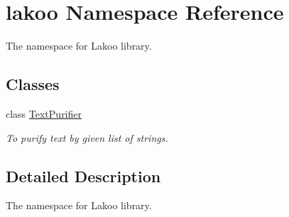 \hypertarget{namespacelakoo}{}\section{lakoo Namespace Reference}
\label{namespacelakoo}


The namespace for Lakoo library.  


\subsection*{Classes}
\begin{DoxyCompactItemize}
\item 
class \hyperlink{classlakoo_1_1_text_purifier}{Text\+Purifier}
\begin{DoxyCompactList}\small\item\em To purify text by given list of strings. \end{DoxyCompactList}\end{DoxyCompactItemize}


\subsection{Detailed Description}
The namespace for Lakoo library. 